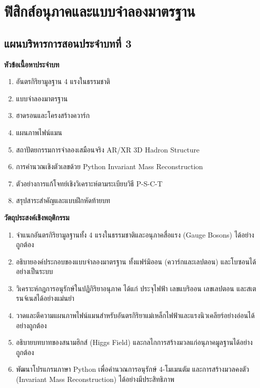\chapter{ฟิสิกส์อนุภาคและแบบจำลองมาตรฐาน}
\label{chap:particle_physics}

\section*{แผนบริหารการสอนประจำบทที่ 3}


\begin{lessonplanbox}
\noindent\textbf{หัวข้อเนื้อหาประจำบท}
\begin{enumerate}
    \item อันตรกิริยามูลฐาน 4 แรงในธรรมชาติ
    \item แบบจำลองมาตรฐาน
    \item ฮาดรอนและโครงสร้างควาร์ก
    \item แผนภาพไฟน์แมน
    \item สถาปัตยกรรมการจำลองเสมือนจริง AR/XR 3D Hadron Structure
    \item การคำนวณเชิงตัวเลขด้วย Python Invariant Mass Reconstruction
    \item ตัวอย่างการแก้โจทย์เชิงวิเคราะห์ตามระเบียบวิธี P-S-C-T
    \item สรุปสาระสำคัญและแบบฝึกหัดท้ายบท
\end{enumerate}

\noindent\textbf{วัตถุประสงค์เชิงพฤติกรรม}
\begin{enumerate}
    \item จำแนกอันตรกิริยามูลฐานทั้ง 4 แรงในธรรมชาติและอนุภาคสื่อแรง (Gauge Bosons) ได้อย่างถูกต้อง
    \item อธิบายองค์ประกอบของแบบจำลองมาตรฐาน ทั้งแฟร์มิออน (ควาร์กและเลปตอน) และโบซอนได้อย่างเป็นระบบ
    \item วิเคราะห์กฎการอนุรักษ์ในปฏิกิริยาอนุภาค ได้แก่ ประจุไฟฟ้า เลขแบริออน เลขเลปตอน และสเตรนจ์เนสได้อย่างแม่นยำ
    \item วาดและตีความแผนภาพไฟน์แมนสำหรับอันตรกิริยาแม่เหล็กไฟฟ้าและแรงนิวเคลียร์อย่างอ่อนได้อย่างถูกต้อง
    \item อธิบายบทบาทของสนามฮิกส์ (Higgs Field) และกลไกการสร้างมวลแก่อนุภาคมูลฐานได้อย่างถูกต้อง
    \item พัฒนาโปรแกรมภาษา Python เพื่อคำนวณการอนุรักษ์ 4-โมเมนตัม และการสร้างมวลคงตัว (Invariant Mass Reconstruction) ได้อย่างมีประสิทธิภาพ
\end{enumerate}


\end{lessonplanbox}

